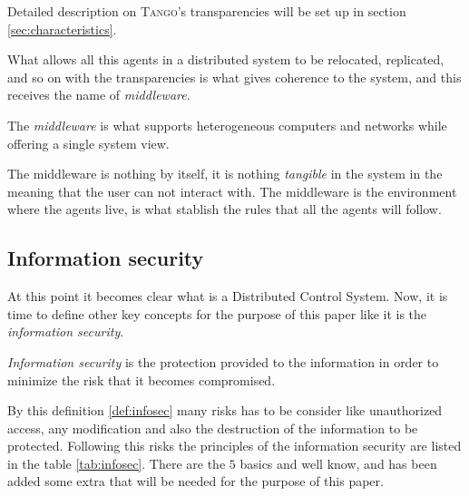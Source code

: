 \documentclass[10pt,a4paper,twoside]{llncs}
\newcommand{\tango}{\textsc{Tango}}
\begin{document}
Detailed description on \tango's transparencies will be set up in section \ref{sec:characteristics}.

What allows all this agents in a distributed system to be relocated, replicated, and so on with the transparencies is what gives coherence to the system, and this receives the name of \emph{middleware}.

\begin{definition}\label{def:middleware}
    The \emph{middleware} is what supports heterogeneous computers and networks while offering a single system view.
\end{definition}

The middleware is nothing by itself, it is nothing \emph{tangible} in the system in the meaning that the user can not interact with. The middleware is the environment where the agents live, is what stablish the rules that all the agents will follow.

\subsection{Information security}\label{sec:InfoSec}

At this point it becomes clear what is a Distributed Control System. Now, it is time to define other key concepts for the purpose of this paper like it is the \emph{information security}. 

\begin{definition}\label{def:infosec}
    \emph{Information security} is the protection provided to the information in order to minimize the risk that it becomes compromised.
\end{definition}

By this definition \ref{def:infosec} many risks has to be consider like unauthorized access, any modification and also the destruction of the information to be protected. Following this risks the principles of the information security are listed in the table \ref{tab:infosec}. There are the $5$ basics and well know, and has been added some extra that will be needed for the purpose of this paper.
\end{document}
